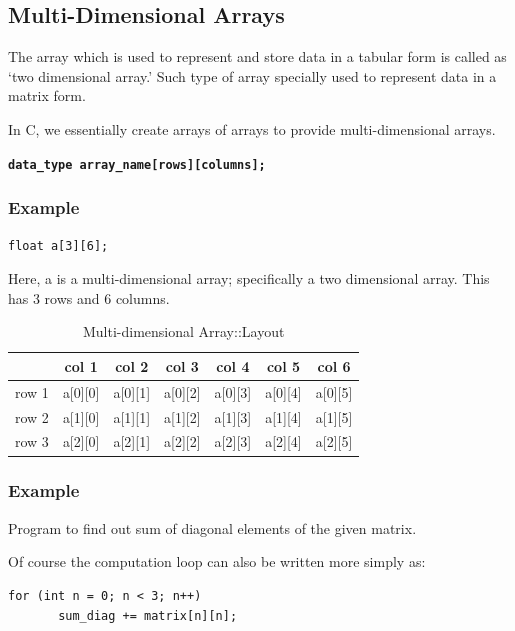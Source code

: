 \documentclass[11pt,a4paper]{article}
\begin{document}
\subsection*{Multi-Dimensional Arrays}
The array which is used to represent and store data in a tabular form is called as `two dimensional array.' Such type of array specially used to represent data in a matrix form.

In C, we essentially create arrays of arrays to provide multi-dimensional arrays.

\textbf{\texttt{data\_type array\_name[rows][columns];}}

\subsubsection*{Example} 

\lstinline!float a[3][6];!

Here, a is a multi-dimensional array; specifically a two dimensional array. This has 3 rows and 6 columns.

\begin{table}[ht]
\centering
\begin{tabular}{|c|c|c|c|c|c|c|}\hline
      & col 1   & col 2   & col 3   & col 4   & col 5   & col  6\\\hline
row 1 & a[0][0] & a[0][1] & a[0][2] & a[0][3] & a[0][4] & a[0][5]\\\hline
row 2 & a[1][0] & a[1][1] & a[1][2] & a[1][3] & a[1][4] & a[1][5]\\\hline
row 3 & a[2][0] & a[2][1] & a[2][2] & a[2][3] & a[2][4] & a[2][5]\\\hline
\end{tabular}
\caption{Multi-dimensional Array::Layout}
\label{matrix}
\end{table}

\subsubsection*{Example} 
Program to find out sum of diagonal elements of the given matrix.


Of course the computation loop can also be written more simply as:
\begin{lstlisting}[numbers=none]
  for (int n = 0; n < 3; n++)
       sum_diag += matrix[n][n];
\end{lstlisting}
\end{document}
